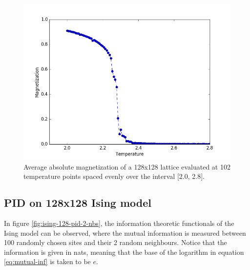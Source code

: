 \documentclass[12pt]{article}
\begin{document}
\begin{figure} [h!]
\begin{center}
\includegraphics[width=\textwidth]{ising-128-mags}
\caption{Average absolute magnetization of a 128x128 lattice evaluated at 102 temperature points spaced evenly over the interval [2.0, 2.8].}
\label{fig:ising-128-mags}
\end{center}
\end{figure}

\subsection{PID on 128x128 Ising model}

In figure \ref{fig:ising-128-pid-2-nbs}, the information theoretic functionals of the Ising model can be observed, where the mutual information is measured between 100 randomly chosen sites and their 2 random neighbours. Notice that the information is given in nats, meaning that the base of the logarithm in equation \ref{eq:mutual-inf} is taken to be $e$. 
\end{document}
